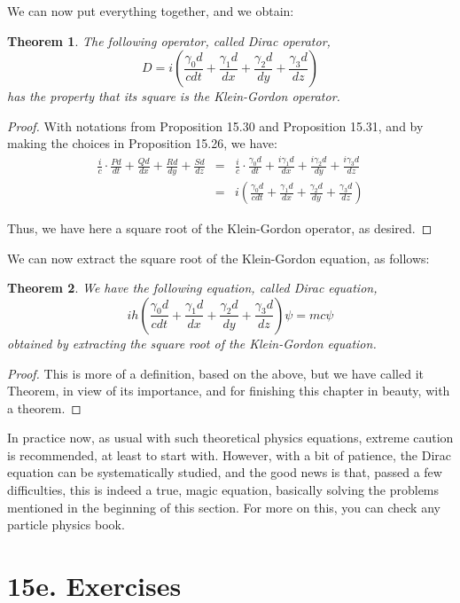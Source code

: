 \documentclass[12pt]{amsbook}
\newtheorem{theorem}{Theorem}[chapter]
\begin{document}
We can now put everything together, and we obtain:

\begin{theorem}
The following operator, called Dirac operator,
$$D=i\left(\frac{\gamma_0d}{cdt}+\frac{\gamma_1d}{dx}+\frac{\gamma_2d}{dy}+\frac{\gamma_3d}{dz}\right)$$
has the property that its square is the Klein-Gordon operator.
\end{theorem}

\begin{proof}
With notations from Proposition 15.30 and Proposition 15.31, and by making the choices in Proposition 15.26, we have:
\begin{eqnarray*}
\frac{i}{c}\cdot\frac{Pd}{dt}+\frac{Qd}{dx}+\frac{Rd}{dy}+\frac{Sd}{dz}
&=&\frac{i}{c}\cdot\frac{\gamma_0d}{dt}+\frac{i\gamma_1d}{dx}+\frac{i\gamma_2d}{dy}+\frac{i\gamma_3d}{dz}\\
&=&i\left(\frac{\gamma_0d}{cdt}+\frac{\gamma_1d}{dx}+\frac{\gamma_2d}{dy}+\frac{\gamma_3d}{dz}\right)
\end{eqnarray*}

Thus, we have here a square root of the Klein-Gordon operator, as desired.
\end{proof}

We can now extract the square root of the Klein-Gordon equation, as follows:

\begin{theorem}
We have the following equation, called Dirac equation,
$$ih\left(\frac{\gamma_0d}{cdt}+\frac{\gamma_1d}{dx}+\frac{\gamma_2d}{dy}+\frac{\gamma_3d}{dz}\right)\psi=mc\psi$$
obtained by extracting the square root of the Klein-Gordon equation.
\end{theorem}

\begin{proof}
This is more of a definition, based on the above, but we have called it Theorem, in view of its importance, and for finishing this chapter in beauty, with a theorem.
\end{proof}

In practice now, as usual with such theoretical physics equations, extreme caution is recommended, at least to start with. However, with a bit of patience, the Dirac equation can be systematically studied, and the good news is that, passed a few difficulties, this is indeed a true, magic equation, basically solving the problems mentioned in the beginning of this section. For more on this, you can check any particle physics book.

\section*{15e. Exercises}
\end{document}
